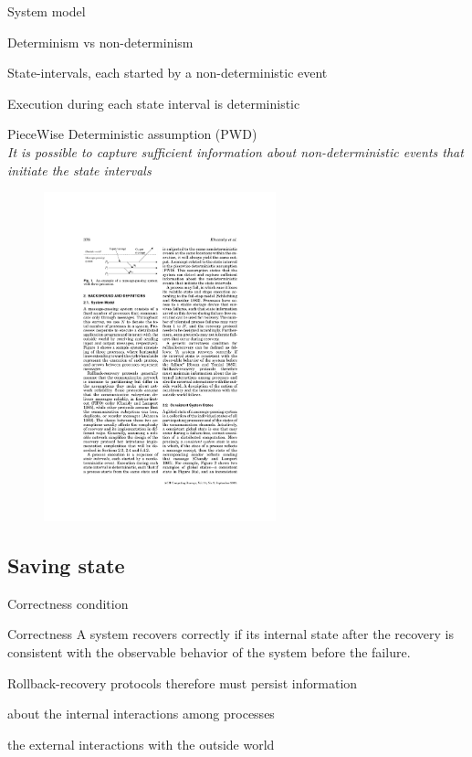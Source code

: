 \begin{frame}{System model}
\begin{block}{Determinism vs non-determinism}
\BIL
\item State-intervals, each started by a non-deterministic event
\item Execution during each state interval is deterministic
\item \alert{PieceWise Deterministic} assumption (PWD)\\
\emph{
It is possible to capture sufficient information about non-deterministic events that initiate the state intervals
}
\EIL
\end{block}
\begin{figure}
	\includegraphics[width=0.6\textwidth]{system}
\end{figure}	

\end{frame}

\subsection{Saving state}


\begin{frame}{Correctness condition}
\begin{block}{Correctness}
A system recovers correctly if its internal state after the recovery is consistent with the observable behavior of the system before the failure.
\end{block}
\bigskip
\BI
\item Rollback-recovery protocols therefore must persist information
\BI
\item about the internal interactions among processes 
\item the external interactions with the outside world
\EI
\EI
\end{frame}

